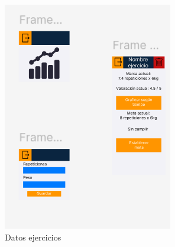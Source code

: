 \begin{figure}[H]
\begin{minipage}[b]{0.45\textwidth}
    \includegraphics[width=\textwidth]{fotos/DatosEjercicios.png}
    \caption{Datos ejercicios}
    \label{fig:Datos ejericicios}
  \end{minipage}
\end{figure}

